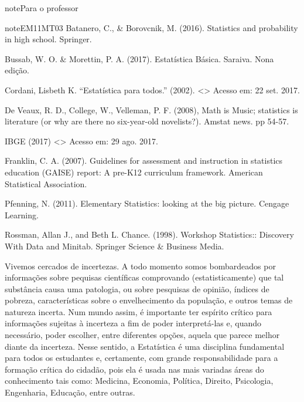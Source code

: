 \begin{sphinxadmonition}{note}{Para o professor}
\begin{sphinxadmonition}{note}{EM11MT03}
Batanero, C., \& Borovcnik, M. (2016). Statistics and probability in high school. Springer.

Bussab, W. O. \& Morettin, P. A. (2017). Estatística Básica.  Saraiva. Nona edição.

Cordani, Lisbeth K. ``Estatística para todos.'' (2002). \textless{}\textgreater{} Acesso em: 22 set. 2017.

De Veaux, R. D., College, W., Velleman, P. F. (2008), Math is Music; statistics is literature (or why are there no six-year-old novelists?). Amstat news. pp 54-57.

IBGE (2017) \textless{}\textgreater{} Acesso em: 29 ago. 2017.

Franklin, C. A. (2007). Guidelines for assessment and instruction in statistics education (GAISE) report: A pre-K\textendash{}12 curriculum framework. American Statistical Association.

Pfenning, N. (2011). Elementary Statistics: looking at the big picture. Cengage Learning.

Rossman, Allan J., and Beth L. Chance. (1998).  Workshop Statistics:: Discovery With Data and Minitab. Springer Science \& Business Media.
\end{sphinxadmonition}
\end{sphinxadmonition}


\label{\detokenize{PE103-0:explorando-compreendendo-a-natureza-da-estatistica}}\label{\detokenize{PE103-0::doc}}\label{\detokenize{PE103-0:cap-a-natureza-da-estatistica}}
Vivemos cercados de incertezas. A todo momento somos bombardeados por informações sobre pequisas científicas comprovando (estatisticamente) que tal substância causa uma patologia, ou sobre pesquisas de opinião, índices de pobreza, características sobre o envelhecimento da população, e outros temas de natureza incerta. Num mundo assim, é importante ter espírito crítico para informações sujeitas à incerteza a fim de poder interpretá-las e, quando necessário, poder escolher, entre diferentes opções, aquela que parece melhor diante da incerteza.  Nesse sentido, a Estatística é uma disciplina fundamental para todos os estudantes e, certamente, com grande responsabilidade para a formação crítica do cidadão, pois ela é usada nas mais variadas áreas do conhecimento tais como: Medicina, Economia, Política, Direito, Psicologia, Engenharia, Educação, entre outras.

